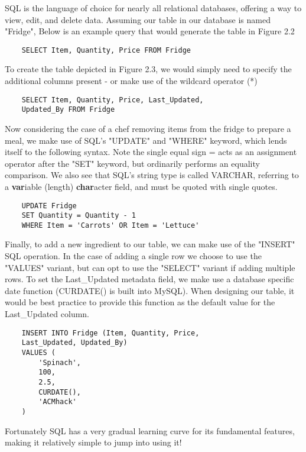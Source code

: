 \begin{kaobox}[title=Working with SQL]
    SQL is the language of choice for nearly all relational databases, offering a way to view, edit, and delete data. Assuming our table in our database is named "Fridge", Below is an example query that would generate the table in Figure 2.2

    \begin{verbatim}
    SELECT Item, Quantity, Price FROM Fridge
    \end{verbatim}

    To create the table depicted in Figure 2.3, we would simply need to specify the additional columns present - or make use of the wildcard operator (*)

    \begin{verbatim}
    SELECT Item, Quantity, Price, Last_Updated, 
    Updated_By FROM Fridge
    \end{verbatim}

    Now considering the case of a chef removing items from the fridge to prepare a meal, we make use of SQL's "UPDATE" and "WHERE" keyword, which lends itself to the following syntax. Note the single equal sign = acts as an assignment operator after the "SET" keyword, but ordinarily performs an equality comparison. We also see that SQL's string type is called VARCHAR, referring to a \textbf{var}iable (length) \textbf{char}acter field, and must be quoted with single quotes.  

    \begin{verbatim}
    UPDATE Fridge
    SET Quantity = Quantity - 1
    WHERE Item = 'Carrots' OR Item = 'Lettuce'
    \end{verbatim}
    
    Finally, to add a new ingredient to our table, we can make use of the "INSERT" SQL operation. In the case of adding a single row we choose to use the "VALUES" variant, but can opt to use the "SELECT" variant if adding multiple rows. To set the Last\_Updated metadata field, we make use a database specific date function (CURDATE() is built into MySQL). When designing our table, it would be best practice to provide this function as the default value for the Last\_Updated column.

    \begin{verbatim}
    INSERT INTO Fridge (Item, Quantity, Price,
    Last_Updated, Updated_By)
    VALUES (
        'Spinach',
        100,
        2.5,
        CURDATE(),
        'ACMhack'
    )

    \end{verbatim}
    
    Fortunately SQL has a very gradual learning curve for its fundamental features, making it relatively simple to jump into using it!
\end{kaobox}

